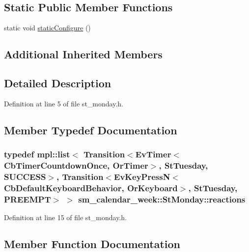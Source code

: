 \subsection*{Static Public Member Functions}
\begin{DoxyCompactItemize}
\item 
static void \hyperlink{structsm__calendar__week_1_1StMonday_a2fae8eddd6ad1990e31982aa044f34eb}{static\+Configure} ()
\end{DoxyCompactItemize}
\subsection*{Additional Inherited Members}


\subsection{Detailed Description}


Definition at line 5 of file st\+\_\+monday.\+h.



\subsection{Member Typedef Documentation}
\subsubsection[{\texorpdfstring{reactions}{reactions}}]{\setlength{\rightskip}{0pt plus 5cm}typedef mpl\+::list$<$ Transition$<$Ev\+Timer$<$Cb\+Timer\+Countdown\+Once, {\bf Or\+Timer}$>$, {\bf St\+Tuesday}, {\bf S\+U\+C\+C\+E\+SS}$>$, Transition$<$Ev\+Key\+PressN$<$Cb\+Default\+Keyboard\+Behavior, {\bf Or\+Keyboard}$>$, {\bf St\+Tuesday}, {\bf P\+R\+E\+E\+M\+PT}$>$ $>$ {\bf sm\+\_\+calendar\+\_\+week\+::\+St\+Monday\+::reactions}}\hypertarget{structsm__calendar__week_1_1StMonday_a6fee9231d13553ae7370225d9b1f28f9}{}\label{structsm__calendar__week_1_1StMonday_a6fee9231d13553ae7370225d9b1f28f9}


Definition at line 15 of file st\+\_\+monday.\+h.



\subsection{Member Function Documentation}
